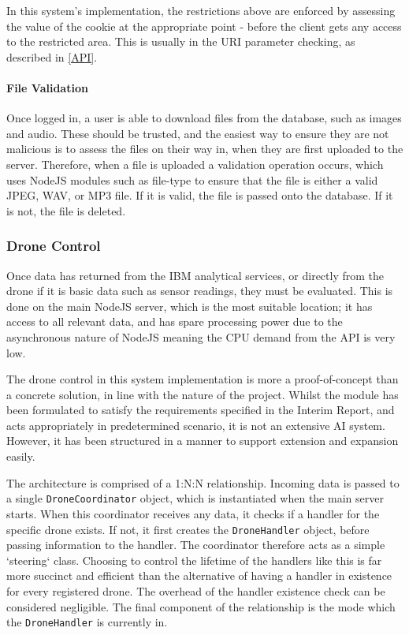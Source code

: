 \documentclass{article}
\begin{document}
In this system's implementation, the restrictions above are enforced by assessing the value of the cookie at the appropriate point - before the client gets any access to the restricted area. This is usually in the URI parameter checking, as described in \ref{API}. 

\paragraph{File Validation}
Once logged in, a user is able to download files from the database, such as images and audio. These should be trusted, and the easiest way to ensure they are not malicious is to assess the files on their way in, when they are first uploaded to the server. Therefore, when a file is uploaded a validation operation occurs, which uses NodeJS modules such as file-type \cite{file-type} to ensure that the file is either a valid JPEG, WAV, or MP3 file. If it is valid, the file is passed onto the database. If it is not, the file is deleted. 


\subsubsection{Drone Control} \label{DroneControl}
Once data has returned from the IBM analytical services, or directly from the drone if it is basic data such as sensor readings, they must be evaluated. This is done on the main NodeJS server, which is the most suitable location; it has access to all relevant data, and has spare processing power due to the asynchronous nature of NodeJS meaning the CPU demand from the API is very low. 

The drone control in this system implementation is more a proof-of-concept than a concrete solution, in line with the nature of the project. Whilst the module has been formulated to satisfy the requirements specified in the Interim Report, and acts appropriately in predetermined scenario, it is not an extensive AI system. However, it has been structured in a manner to support extension and expansion easily. 

The architecture is comprised of a 1:N:N relationship. Incoming data is passed to a single \texttt{DroneCoordinator} object, which is instantiated when the main server starts. When this coordinator receives any data, it checks if a handler for the specific drone exists. If not, it first creates the \texttt{DroneHandler} object, before passing information to the handler. The coordinator therefore acts as a simple `steering` class. Choosing to control the lifetime of the handlers like this is far more succinct and efficient than the alternative of having a handler in existence for every registered drone. The overhead of the handler existence check can be considered negligible. The final component of the relationship is the mode which the \texttt{DroneHandler} is currently in. 
\end{document}
